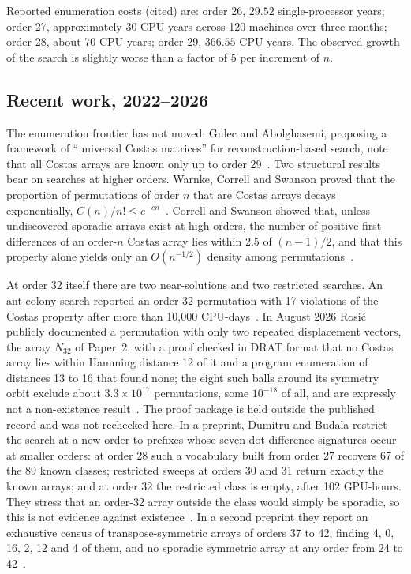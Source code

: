 \documentclass[11pt,a4paper,oneside]{report}
\theoremstyle{definition}
\begin{document}
Reported enumeration costs (cited) are: order 26, $29.52$ single-processor
years; order 27, approximately 30 CPU-years across 120 machines over three
months; order 28, about 70 CPU-years; order 29, $366.55$ CPU-years. The observed
growth of the search is slightly worse than a factor of 5 per increment of $n$.

\subsection{Recent work, 2022--2026}
\label{p1-sec:recent}
The enumeration frontier has not moved: Gulec and Abolghasemi, proposing a framework of ``universal
Costas matrices'' for reconstruction-based search, note that all Costas arrays are known only up to
order 29~\cite{p1-gulec2026ucm}. Two structural results bear on searches at higher orders. Warnke, Correll
and Swanson proved that the proportion of permutations of order $n$ that are Costas arrays decays
exponentially, $C(n)/n!\le e^{-cn}$~\cite{p1-warnke2023density}. Correll and Swanson showed that, unless
undiscovered sporadic arrays exist at high orders, the number of positive first differences of an
order-$n$ Costas array lies within 2.5 of $(n-1)/2$, and that this property alone yields only an
$O(n^{-1/2})$ density among permutations~\cite{p1-correll2023difference}.

At order 32 itself there are two near-solutions and two restricted searches. An ant-colony search reported
an order-32 permutation with 17 violations of the Costas property after more than 10{,}000
CPU-days~\cite{p1-vulakh2022mdraco}. In August 2026 Rosi\'c publicly documented a permutation with only two
repeated displacement vectors, the array $N_{32}$ of Paper~2, with a proof checked in DRAT format that no
Costas array lies within Hamming distance 12 of it and a program enumeration of distances 13 to 16 that
found none; the eight such balls around its symmetry orbit exclude about $3.3\times10^{17}$ permutations,
some $10^{-18}$ of all, and are expressly not a non-existence result~\cite{p1-rosic2026gist}. The proof
package is held outside the published record and was not rechecked here. In a preprint, Dumitru and
Budala restrict the search at a new order to prefixes whose seven-dot difference signatures occur at
smaller orders: at order 28 such a vocabulary built from order 27 recovers 67 of the 89 known classes;
restricted sweeps at orders 30 and 31 return exactly the known arrays; and at order 32 the restricted
class is empty, after 102 GPU-hours. They stress that an order-32 array outside the class would simply be
sporadic, so this is not evidence against existence~\cite{p1-dumitru2026localpatterns}. In a second preprint
they report an exhaustive census of transpose-symmetric arrays of orders 37 to 42, finding 4, 0, 16, 2, 12
and 4 of them, and no sporadic symmetric array at any order from 24 to 42~\cite{p1-dumitru2026symmetriccensus}.
\end{document}
